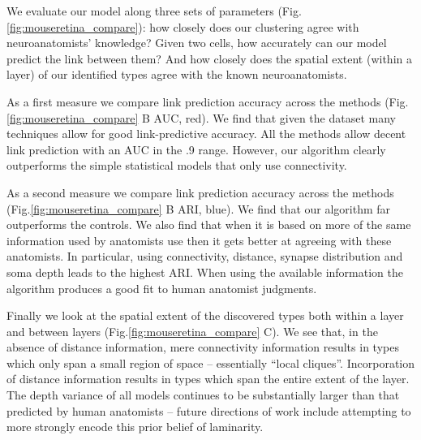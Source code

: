 \documentclass{article}
\begin{document}
We evaluate our model along three sets of parameters
(Fig.\ref{fig:mouseretina_compare}): how closely does our clustering agree
with neuroanatomists' knowledge?  Given two cells, how accurately can
our model predict the link between them? And how closely does the
spatial extent (within a layer) of our identified types agree with the
known neuroanatomists.

As a first measure we compare link prediction accuracy across the
methods (Fig.\ref{fig:mouseretina_compare} B AUC, red).  We find that
given the dataset many techniques allow for good link-predictive
accuracy. All the methods allow decent link prediction with an AUC in
the .9 range. However, our algorithm clearly outperforms the simple
statistical models that only use connectivity.

As a second measure we compare link prediction accuracy across the
methods (Fig.\ref{fig:mouseretina_compare} B ARI, blue). We find that our
algorithm far outperforms the controls. We also find that when it is
based on more of the same information used by anatomists use then it
gets better at agreeing with these anatomists. In particular, using
connectivity, distance, synapse distribution and soma depth leads to
the highest ARI. When using the available information the algorithm
produces a good fit to human anatomist judgments.

Finally we look at the spatial extent of the discovered types both
within a layer and between layers (Fig.\ref{fig:mouseretina_compare}
C). We see that, in the absence of distance information, mere
connectivity information results in types which only span a small
region of space -- essentially “local cliques”. Incorporation of
distance information results in types which span the entire extent of
the layer. The depth variance of all models continues to be
substantially larger than that predicted by human anatomists -- future
directions of work include attempting to more strongly encode this
prior belief of laminarity.
\end{document}
